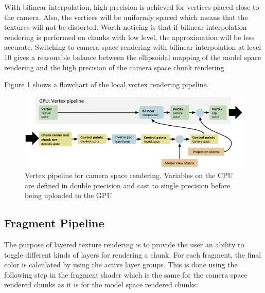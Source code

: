 With bilinear interpolation, high precision is achieved for vertices placed close to the camera. Also, the vertices will be uniformly spaced which means that the textures will not be distorted. Worth noticing is that if bilinear interpolation rendering is performed on chunks with low level, the approximation will be less accurate. Switching to camera space rendering with bilinear interpolation at level 10 gives a reasonable balance between the ellipsoidal mapping of the model space rendering and the high precision of the camera space chunk rendering.

Figure \ref{fig:pipelinelocal} shows a flowchart of the local vertex rendering pipeline.

\begin{figure}[htbp]
    \centering
    \includegraphics[width=\textwidth]{figures/implementation/rendering/pipeline_local.pdf}
    \caption{Vertex pipeline for camera space rendering. Variables on the CPU are defined in double precision and cast to single precision before being uploaded to the GPU}
    \label{fig:pipelinelocal}
\end{figure}

\subsection{Fragment Pipeline}

The purpose of layered texture rendering is to provide the user an ability to toggle different kinds of layers for rendering a chunk. For each fragment, the final color is calculated by using the active layer groups. This is done using the following step in the fragment shader which is the same for the camera space rendered chunks as it is for the model space rendered chunks:


